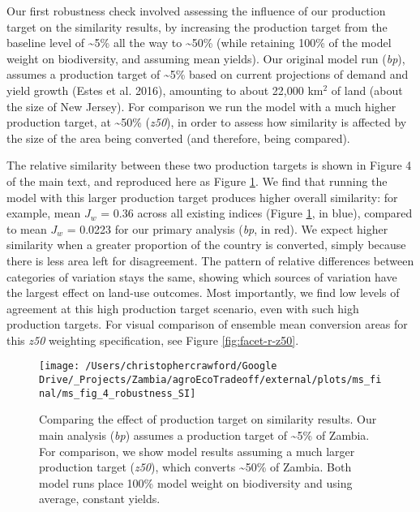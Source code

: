 \documentclass[
]{article}
\begin{document}
Our first robustness check involved assessing the influence of our production target on the similarity results, by increasing the production target from the baseline level of \textasciitilde5\% all the way to \textasciitilde50\% (while retaining 100\% of the model weight on biodiversity, and assuming mean yields). Our original model run (\emph{bp}), assumes a production target of \textasciitilde5\% based on current projections of demand and yield growth (Estes et al. 2016), amounting to about 22,000 km\(^2\) of land (about the size of New Jersey). For comparison we run the model with a much higher production target, at \textasciitilde50\% (\emph{z50}), in order to assess how similarity is affected by the size of the area being converted (and therefore, being compared).

The relative similarity between these two production targets is shown in Figure 4 of the main text, and reproduced here as Figure \ref{fig:z50-bp-comparison}. We find that running the model with this larger production target produces higher overall similarity: for example, mean \(J_w\) = 0.36 across all existing indices (Figure \ref{fig:z50-bp-comparison}, in blue), compared to mean \(J_w\) = 0.0223 for our primary analysis (\emph{bp}, in red). We expect higher similarity when a greater proportion of the country is converted, simply because there is less area left for disagreement. The pattern of relative differences between categories of variation stays the same, showing which sources of variation have the largest effect on land-use outcomes. Most importantly, we find low levels of agreement at this high production target scenario, even with such high production targets. For visual comparison of ensemble mean conversion areas for this \emph{z50} weighting specification, see Figure \ref{fig:facet-r-z50}.



\begin{figure}
\texttt{[image: /Users/christophercrawford/Google Drive/\_Projects/Zambia/agroEcoTradeoff/external/plots/ms\_final/ms\_fig\_4\_robustness\_SI]} \caption{Comparing the effect of production target on similarity results. Our main analysis (\emph{bp}) assumes a production target of \textasciitilde5\% of Zambia. For comparison, we show model results assuming a much larger production target (\emph{z50}), which converts \textasciitilde50\% of Zambia. Both model runs place 100\% model weight on biodiversity and using average, constant yields.}\label{fig:z50-bp-comparison}
\end{figure}
\end{document}
